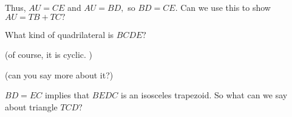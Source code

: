 Thus, $AU = CE$ and $AU = BD,$ so $BD = CE.$  Can we use this to show $AU = TB + TC?$



What kind of quadrilateral is $BCDE?$

(of course, it is cyclic.  )

(can you say more about it?)







$BD = EC$ implies that $BEDC$ is an isosceles trapezoid.  So what can we say about triangle $TCD?$










